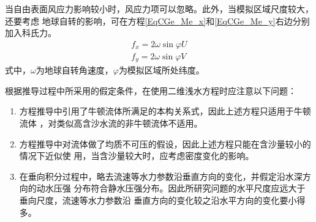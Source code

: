                                                         当自由表面风应力影响较小时，风应力项可以忽略。此外，当模拟区域尺度较大，还要考虑
                                                        地球自转的影响，可在方程\eqref{EqCGe_Me_x}和\eqref{EqCGe_Me_y}右边分别加入科氏力。
                                                        \begin{equation}
                                                          \begin{aligned}
                                                            f_x = 2\omega\sin\varphi U
                                                            \\
                                                            f_y = 2\omega\sin\varphi V
                                                          \end{aligned}
                                                        \end{equation}
                                                        式中，$\omega$为地球自转角速度，$\varphi$为模拟区域所处纬度。

                                                        根据推导过程中所采用的假定条件，在使用二维浅水方程时应注意以下问题：
                                                        \begin{enumerate}
                                                          \item 方程推导中引用了牛顿流体所满足的本构关系式，因此上述方程只适用于牛顿流体
                                                            ，对类似高含沙水流的非牛顿流体不适用。
                                                          \item 方程推导中对流体做了均质不可压的假设，因此上述方程只能在含沙量较小的情况下近似使
                                                            用，当含沙量较大时，应考虑密度变化的影响。
                                                          \item 在垂向积分过程中，略去流速等水力参数沿垂直方向的变化，并假定沿水深方向的动水压强
                                                            分布符合静水压强分布。因此所研究问题的水平尺度应远大于垂向尺度，流速等水力参数沿
                                                            垂直方向的变化较之沿水平方向的变化要小得多。
                                                        \end{enumerate}


